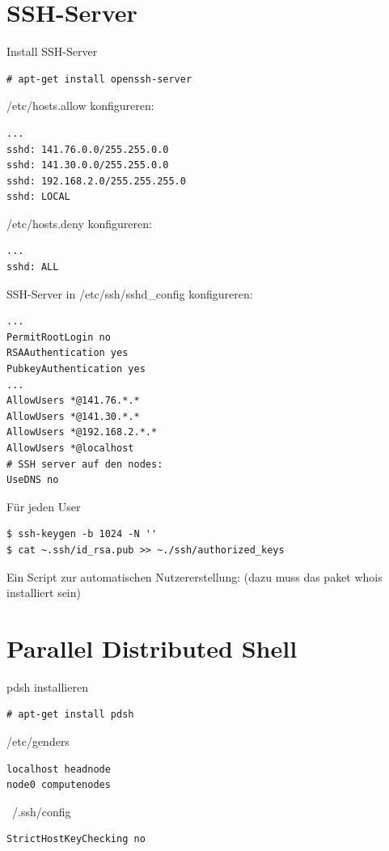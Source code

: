 \section{SSH-Server}
Install SSH-Server
\begin{lstlisting}[style=Bash]
# apt-get install openssh-server 
\end{lstlisting}


/etc/hosts.allow konfigureren:
\begin{lstlisting}[style=Bash]
...
sshd: 141.76.0.0/255.255.0.0
sshd: 141.30.0.0/255.255.0.0
sshd: 192.168.2.0/255.255.255.0
sshd: LOCAL 
\end{lstlisting}
/etc/hosts.deny konfigureren:
\begin{lstlisting}[style=Bash]
...
sshd: ALL
\end{lstlisting}

SSH-Server in /etc/ssh/sshd\_config konfigureren:
\begin{lstlisting}[style=Bash]
...
PermitRootLogin no
RSAAuthentication yes
PubkeyAuthentication yes
...
AllowUsers *@141.76.*.*
AllowUsers *@141.30.*.*
AllowUsers *@192.168.2.*.*
AllowUsers *@localhost
# SSH server auf den nodes:
UseDNS no
\end{lstlisting}

Für jeden User
\begin{lstlisting}[style=Bash]
$ ssh-keygen -b 1024 -N ''
$ cat ~.ssh/id_rsa.pub >> ~./ssh/authorized_keys
\end{lstlisting}

Ein Script zur automatischen Nutzererstellung:
(dazu muss das paket whois installiert sein)


\section{Parallel Distributed Shell}
pdsh installieren
\begin{lstlisting}[style=Bash]
# apt-get install pdsh
\end{lstlisting}
/etc/genders
\begin{lstlisting}[style=Bash]
localhost headnode
node0 computenodes
\end{lstlisting}
~/.ssh/config
\begin{lstlisting}[style=Bash]
StrictHostKeyChecking no
\end{lstlisting}

